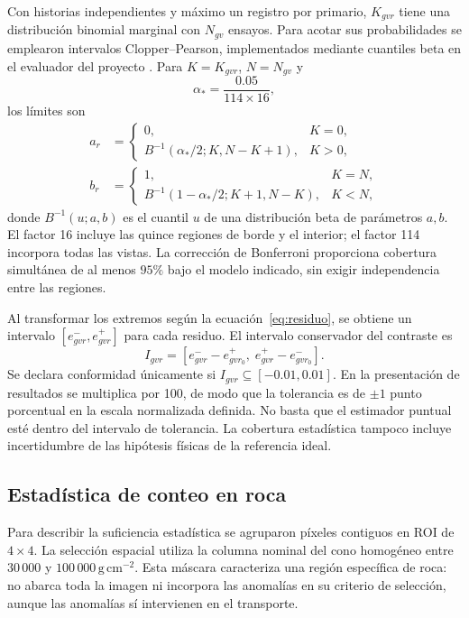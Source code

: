 \documentclass[11pt,a4paper]{article}
\begin{document}
Con historias independientes y máximo un registro por primario, $K_{gvr}$ tiene una distribución binomial marginal con $N_{gv}$ ensayos. Para acotar sus probabilidades se emplearon intervalos Clopper--Pearson, implementados mediante cuantiles beta en el evaluador del proyecto \cite{estadistica}. Para $K=K_{gvr}$, $N=N_{gv}$ y
\begin{equation}
 \alpha_* = \frac{0.05}{114\times16},
\end{equation}
los límites son
\begin{align}
 a_r&=\begin{cases}0,&K=0,\\
 B^{-1}(\alpha_*/2;K,N-K+1),&K>0,\end{cases}\\
 b_r&=\begin{cases}1,&K=N,\\
 B^{-1}(1-\alpha_*/2;K+1,N-K),&K<N,\end{cases}
\end{align}
donde $B^{-1}(u;a,b)$ es el cuantil $u$ de una distribución beta de parámetros $a,b$. El factor 16 incluye las quince regiones de borde y el interior; el factor 114 incorpora todas las vistas. La corrección de Bonferroni proporciona cobertura simultánea de al menos $95\%$ bajo el modelo indicado, sin exigir independencia entre las regiones.

Al transformar los extremos según la ecuación~\eqref{eq:residuo}, se obtiene un intervalo $[e^-_{gvr},e^+_{gvr}]$ para cada residuo. El intervalo conservador del contraste es
\begin{equation}
 I_{gvr}=\left[e^-_{gvr}-e^+_{gvr_0},\;
 e^+_{gvr}-e^-_{gvr_0}\right].
\end{equation}
Se declara conformidad únicamente si $I_{gvr}\subseteq[-0.01,0.01]$. En la presentación de resultados se multiplica por 100, de modo que la tolerancia es de $\pm1$ punto porcentual en la escala normalizada definida. No basta que el estimador puntual esté dentro del intervalo de tolerancia. La cobertura estadística tampoco incluye incertidumbre de las hipótesis físicas de la referencia ideal.

\subsection{Estadística de conteo en roca}

Para describir la suficiencia estadística se agruparon píxeles contiguos en ROI de $4\times4$. La selección espacial utiliza la columna nominal del cono homogéneo entre $30\,000$ y $100\,000\,\mathrm{g\,cm^{-2}}$. Esta máscara caracteriza una región específica de roca: no abarca toda la imagen ni incorpora las anomalías en su criterio de selección, aunque las anomalías sí intervienen en el transporte.
\end{document}
